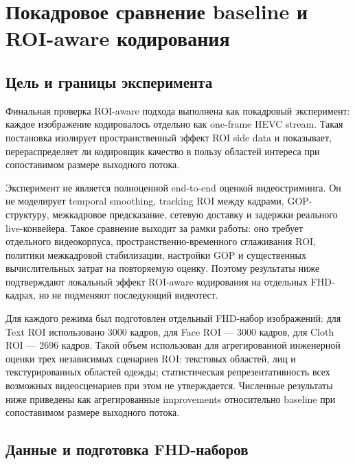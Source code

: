 \documentclass[12pt,a4paper,oneside,openany]{report}
\begin{document}

\chapter{Покадровое сравнение baseline и ROI-aware кодирования}


\section{Цель и границы эксперимента}

Финальная проверка ROI-aware подхода выполнена как покадровый эксперимент: каждое изображение
кодировалось отдельно как one-frame HEVC stream. Такая постановка изолирует пространственный
эффект ROI side data и показывает, перераспределяет ли кодировщик качество в пользу областей
интереса при сопоставимом размере выходного потока.

Эксперимент не является полноценной end-to-end оценкой видеостриминга. Он не моделирует temporal
smoothing, tracking ROI между кадрами, GOP-структуру, межкадровое предсказание, сетевую
доставку и задержки реального live-конвейера. Такое сравнение выходит за рамки работы: оно
требует отдельного видеокорпуса, пространственно-временного сглаживания ROI, политики
межкадровой стабилизации, настройки GOP и существенных вычислительных затрат на повторяемую
оценку. Поэтому результаты ниже подтверждают локальный эффект ROI-aware кодирования на
отдельных FHD-кадрах, но не подменяют последующий видеотест.

Для каждого режима был подготовлен отдельный FHD-набор изображений: для Text ROI использовано
3000 кадров, для Face ROI --- 3000 кадров, для Cloth ROI --- 2696 кадров. Такой объем
использован для агрегированной инженерной оценки трех независимых сценариев ROI: текстовых
областей, лиц и текстурированных областей одежды; статистическая репрезентативность всех
возможных видеосценариев при этом не утверждается. Численные результаты ниже приведены как
агрегированные improvements относительно baseline при сопоставимом размере выходного потока.


\section{Данные и подготовка FHD-наборов}
\end{document}
